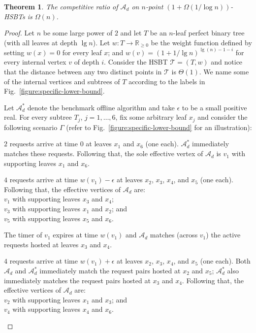 \documentclass[11pt]{article}
\newtheorem{theorem}{Theorem}[section]
\theoremstyle{definition}
\theoremstyle{plain}
\newtheorem{theorem}{Theorem}
\theoremstyle{definition}
\theoremstyle{plain}
\newtheorem{theorem}{Theorem}[section]
\theoremstyle{definition}
\theoremstyle{plain}
\newenvironment{DenseItemize}[0]
{\begin{list}{\labelitemi}{\usecounter{enumi}
\itemsep 0pt \parsep 0pt \leftmargin 5mm \labelwidth 5mm \parskip 0pt \topsep
0pt}}
{\end{list}}
\newcommand{\Fig}{Fig.}
\newcommand{\Reals}{\mathbb{R}}
\newcommand{\A}{\mathcal{A}}
\newcommand{\adv}[1]{{#1}^{*}}
\begin{document}
\begin{theorem} \label{theorem:specific-lower-bound}
The competitive ratio of $\A_{d}$ on $n$-point
$(1 + \Omega (1 / \log n))$-HSBTs
is $\Omega (n)$.
\end{theorem}
%
\begin{proof}
Let $n$ be some large power of $2$ and let $T$ be an $n$-leaf perfect binary
tree (with all leaves at depth $\lg n$).
Let
$w : T \rightarrow \Reals_{\geq 0}$
be the weight function defined by setting
$w(x) = 0$
for every leaf $x$; and
$w(v) = (1 + 1 / \lg n)^{\lg(n) - 1 - i}$
for every internal vertex $v$ of depth $i$.
Consider the HSBT
$\mathcal{T} = (T, w)$
and notice that the distance between any two distinct points in $\mathcal{T}$
is $\Theta (1)$.
We name some of the internal vertices and subtrees of $T$ according to the
labels in \Fig{}~\ref{figure:specific-lower-bound}.

Let $\adv{\A}_{d}$ denote the benchmark offline algorithm and take $\epsilon$
to be a small positive real.
For every subtree $T_{j}$, $j = 1, \dots, 6$, fix some arbitrary leaf $x_{j}$
and consider the following scenario $\Gamma$ (refer to
\Fig{}~\ref{figure:specific-lower-bound} for an illustration):

\begin{DenseItemize}

\item
$2$ requests arrive at time $0$ at leaves $x_{1}$ and $x_{6}$ (one each).
$\adv{\A}_{d}$ immediately matches these requests.
Following that, the sole effective vertex of $\A_{d}$ is $v_{1}$ with supporting
leaves $x_{1}$ and $x_{6}$.

\item
$4$ requests arrive at time
$w(v_{1}) - \epsilon$
at leaves
$x_{2}$, $x_{3}$, $x_{4}$, and $x_{5}$ (one each).
Following that, the effective vertices of $\A_{d}$ are: \\
$v_{1}$ with supporting leaves $x_{3}$ and $x_{4}$; \\
$v_{3}$ with supporting leaves $x_{1}$ and $x_{2}$; and \\
$v_{5}$ with supporting leaves $x_{5}$ and $x_{6}$.

\item
The timer of $v_{1}$ expires at time $w(v_{1})$ and $\A_{d}$ matches (across
$v_{1}$) the active requests hosted at leaves $x_{3}$ and $x_{4}$.

\item
$4$ requests arrive at time
$w(v_{1}) + \epsilon$
at leaves
$x_{2}$, $x_{3}$, $x_{4}$, and $x_{5}$ (one each).
Both $\A_{d}$ and $\adv{\A}_{d}$ immediately match the request pairs hosted at
$x_{2}$ and $x_{5}$;
$\adv{\A}_{d}$ also immediately matches the request pairs hosted at $x_{3}$
and $x_{4}$.
Following that, the effective vertices of $\A_{d}$ are: \\
$v_{2}$ with supporting leaves $x_{1}$ and $x_{3}$; and \\
$v_{4}$ with supporting leaves $x_{4}$ and $x_{6}$.


\end{DenseItemize}
\end{proof}
\end{document}

